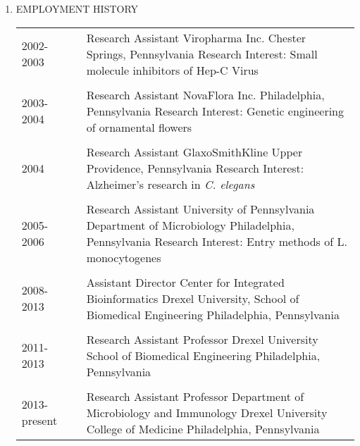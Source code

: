 \documentclass[a4paper,10pt]{article}
\begin{document}
\begin{enumerate}
\begin{longtable}{p{}p{}p{}}
 \end{longtable}
 \item EMPLOYMENT HISTORY
  \begin{longtable}{p{}p{}p{}}
  2002-2003 & & Research Assistant \newline Viropharma Inc. \newline Chester Springs, Pennsylvania \newline Research Interest: Small molecule inhibitors of Hep-C Virus\\
  \\
  2003-2004 & & Research Assistant \newline NovaFlora Inc. \newline Philadelphia, Pennsylvania \newline Research Interest: Genetic engineering of ornamental flowers\\
  \\
  2004 & & Research Assistant \newline GlaxoSmithKline \newline Upper Providence, Pennsylvania \newline Research Interest: Alzheimer’s research in \emph{C. elegans}\\
  \\
  2005-2006 & & Research Assistant \newline University of Pennsylvania \newline Department of Microbiology \newline Philadelphia, Pennsylvania \newline Research Interest: Entry methods of L. monocytogenes\\
  \\
  2008-2013 & & Assistant Director \newline Center for Integrated Bioinformatics \newline Drexel University, School of Biomedical Engineering \newline Philadelphia, Pennsylvania\\
  \\
  2011-2013 & & Research Assistant Professor \newline Drexel University \newline School of Biomedical Engineering \newline Philadelphia, Pennsylvania\\
  \\
  2013-present & & Research Assistant Professor \newline Department of Microbiology and Immunology \newline Drexel University College of Medicine \newline Philadelphia, Pennsylvania\\

\end{longtable}
\end{enumerate}
\end{document}
